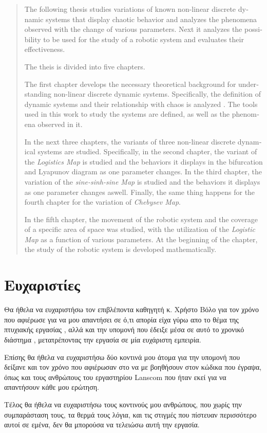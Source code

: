 \begin{otherlanguage}{english} 
\begin{abstract}
	The following thesis studies variations of known non-linear discrete dynamic systems that display chaotic behavior and analyzes the phenomena observed with the change of various parameters. Next it analyzes the possibility to be used for the study of a robotic system and evaluates their effectiveness.
	
	The theis is divided into five chapters.
	
	The first chapter develops the necessary theoretical background for understanding non-linear discrete dynamic systems. Specifically, the definition of dynamic systems and their relationship with chaos is analyzed . The tools used in this work to study the systems are defined, as well as the phenomena observed in it.
	
	In the next three chapters, the variants of three non-linear discrete dynamical systems are studied. Specifically, in the second chapter, the variant of the \emph{Logistics Map} is studied and the behaviors it displays in the bifurcation and Lyapunov diagram as one parameter changes. In the third chapter, the variation of the \emph{sine-sinh-sine Map} is studied and the behaviors it displays as one parameter changes aswell. Finally, the same thing happens for the fourth chapter for the variation of \emph{Chebysev Map}.
	
	In the fifth chapter, the movement of the robotic system and the coverage of a specific area of ​​space was studied, with the utilization of the \emph{Logistic Map} as a function of various parameters. At the beginning of the chapter, the study of the robotic system is developed mathematically.
	
	
\end{abstract}
\end{otherlanguage}
\thispagestyle{empty}


\section*{Ευχαριστίες}
\thispagestyle{empty}

Θα ήθελα να ευχαριστήσω τον επιβλέποντα καθηγητή κ. Χρήστο Βόλο για τον χρόνο που αφιέρωσε για να μου απαντήσει σε ό,τι απορία είχα γύρω απο το θέμα της πτυχιακής εργασίας , αλλά και την υπομονή που έδειξε μέσα σε αυτό το χρονικό διάστημα , μετατρέποντας την εργασία σε μία ευχάριστη εμπειρία.

Επίσης θα ήθελα να ευχαριστήσω δύο κοντινά μου άτομα για την υπομονή που δείξανε και τον χρόνο που αφιέρωσαν στο να με βοηθήσουν στον κώδικα που έγραψα, όπως και τους ανθρώπους του εργαστηρίου Lanscom που ήταν εκεί για να απαντήσουν κάθε μου ερώτηση.

Τέλος θα ήθελα να ευχαριστήσω τους κοντινούς μου ανθρώπους, που χωρίς την συμπαράσταση τους, τα θερμά τους λόγια, και τις στιγμές που πίστευαν περισσότερο αυτοί σε εμένα, δεν θα μπορούσα να τελειώσω αυτή την εργασία.

\clearpage
